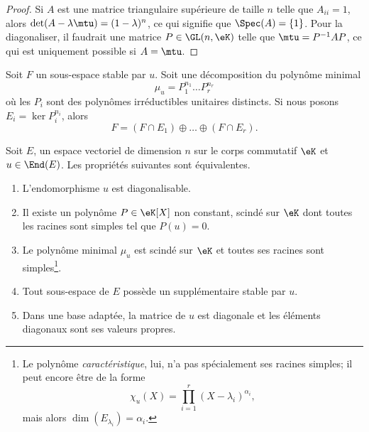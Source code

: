 \begin{proof}
    Si \( A\) est une matrice triangulaire supérieure de taille \( n\) telle que \( A_{ii}=1\), alors \( \det(A-\lambda\mtu)=(1-\lambda)^n\), ce qui signifie que \( \Spec(A)=\{ 1 \}\). Pour la diagonaliser, il faudrait une matrice \( P\in\GL(n,\eK)\) telle que \( \mtu=P^{-1}AP\), ce qui est uniquement possible si \( A=\mtu\).
\end{proof}

\begin{lemma}       \label{LemgnaEOk}
    Soit \( F\) un sous-espace stable par \( u\). Soit une décomposition du polynôme minimal
    \begin{equation}
        \mu_u=P_1^{n_1}\ldots P_r^{n_r}
    \end{equation}
    où les \( P_i\) sont des polynômes irréductibles unitaires distincts. Si nous posons \( E_i=\ker P_i^{n_i}\), alors
    \begin{equation}
        F=(F\cap E_1)\oplus\ldots \oplus(F\cap E_r).
    \end{equation}
\end{lemma}

\begin{theorem}     \label{ThoDigLEQEXR}
    Soit \( E\), un espace vectoriel de dimension \( n\) sur le corps commutatif \( \eK\) et \( u\in\End(E)\). Les propriétés suivantes sont équivalentes.
    \begin{enumerate}
        \item\label{ItemThoDigLEQEXRiv}
            L'endomorphisme \( u\) est diagonalisable.
        \item       \label{ItemThoDigLEQEXRi}
            Il existe un polynôme \( P\in\eK[X]\) non constant, scindé sur \(\eK\) dont toutes les racines sont simples tel que \( P(u)=0\).
        \item\label{ItemThoDigLEQEXRii}
            Le polynôme minimal \( \mu_u\) est scindé sur \(\eK\) et toutes ses racines sont simples\footnote{Le polynôme \emph{caractéristique}, lui, n'a pas spécialement ses racines simples; il peut encore être de la forme
            \begin{equation}
                \chi_u(X)=\prod_{i=1}^r(X-\lambda_i)^{\alpha_i},
        \end{equation}
        mais alors \( \dim(E_{\lambda_i})=\alpha_i\). }.
        \item\label{ItemThoDigLEQEXRiii}
            Tout sous-espace de \( E\) possède un supplémentaire stable par \( u\).
        \item       \label{ITEMooZNJFooEiqDYp}
            Dans une base adaptée, la matrice de \( u\) est diagonale et les éléments diagonaux sont ses valeurs propres.
    \end{enumerate}
\end{theorem}

